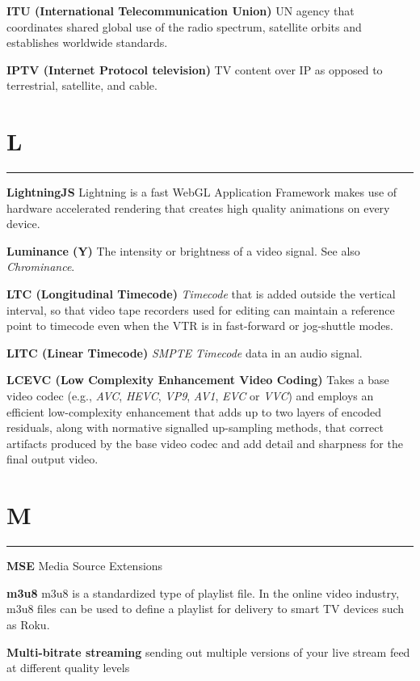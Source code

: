 \smallskip
\textbf{ITU (International Telecommunication Union)}
UN agency that coordinates shared global use of the radio spectrum, satellite orbits and establishes worldwide standards.

\medskip
\textbf{IPTV (Internet Protocol television)}
TV content over IP as opposed to terrestrial, satellite, and cable.


\section{L}
\hrule

\smallskip
\textbf{LightningJS}
Lightning is a fast WebGL Application Framework makes use of hardware accelerated rendering that creates high quality animations on every device.

\smallskip
\textbf{Luminance (Y)}
The intensity or brightness of a video signal. See also \textit{Chrominance}.

\smallskip
\textbf{LTC (Longitudinal Timecode)}
\textit{Timecode} that is added outside the vertical interval, so that video tape recorders used for editing can maintain a reference point to timecode even when the VTR is in fast-forward or jog-shuttle modes.

\smallskip
\textbf{LITC (Linear Timecode)}
\textit{SMPTE} \textit{Timecode} data in an audio signal.

\smallskip
\textbf{LCEVC (Low Complexity Enhancement Video Coding)}
Takes a base video codec (e.g., \textit{AVC}, \textit{HEVC}, \textit{VP9}, \textit{AV1}, \textit{EVC} or \textit{VVC}) and employs an efficient low-complexity enhancement that adds up to two layers of encoded residuals, along with normative signalled up-sampling methods, that correct artifacts produced by the base video codec and add detail and sharpness for the final output video.


\section{M}
\hrule

\smallskip
\textbf{MSE}
Media Source Extensions

\smallskip
\textbf{m3u8}
m3u8 is a standardized type of playlist file. In the online video industry, m3u8 files can be used to define a playlist for delivery to smart TV devices such as Roku.

\smallskip
\textbf{Multi-bitrate streaming}
sending out multiple versions of your live stream feed at different quality levels

